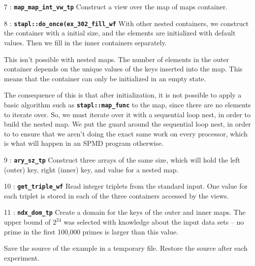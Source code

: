 \documentclass{report}
\begin{document}
\begin{hashitemize}
\item 7 : \texttt{{\bf map\_map\_int\_vw\_tp}}
\newline
Construct a view over the map of maps container.

\item 8 : \texttt{{\bf stapl::do\_once(ex\_302\_fill\_wf}}
\newline
With other nested containers, we construct the container with a initial
size, and the elements are initialized with default values.  Then we fill
in the inner containers separately.

This isn't possible with nested maps.  The number of elements in the outer
container depends on the unique values of the keys inserted into the map.
This means that the container can only be initialized in an empty state.

The consequence of this is that after initialization, it is not possible
to apply a basic algorithm such as
\texttt{{\bf stapl::map\_func}}
to the map, since there are no elements
to iterate over.  So, we must iterate over it with a sequential loop nest,
in order to build the nested map.
We put the guard around the sequential loop nest, in order to to ensure
that we aren't doing the exact same work on every processor, which is what
will happen in an SPMD program otherwise.

\item 9 : \texttt{{\bf ary\_sz\_tp}}
\newline
Construct three arrays of the same size, which will hold
the left (outer) key, right (inner) key, and value for a nested map.

\item 10 : \texttt{{\bf get\_triple\_wf}}
\newline
Read integer triplets from the standard input.  One value for each
triplet is stored in each of the three containers accessed by the views.

\item 11 : \texttt{{\bf ndx\_dom\_tp}}
\newline
Create a domain for the keys of the outer and inner maps.
The upper bound of $2^{24}$ was selected with knowledge about the input
data sets -- no prime in the first 100,000 primes is larger than this value.

\end{hashitemize}

Save the source of the example in a temporary file.
Restore the source after each experiment.
\end{document}
